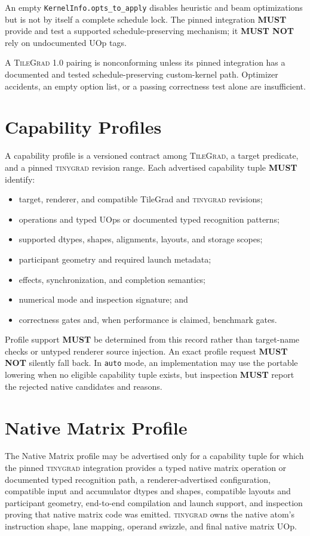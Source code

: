 \documentclass[10pt,letterpaper]{article}
\newcommand{\TileGrad}{\textsc{TileGrad}}
\newcommand{\tinygrad}{\textsc{tinygrad}}
\newcommand{\must}{\textbf{MUST}}
\newcommand{\mustnot}{\textbf{MUST NOT}}
\begin{document}
An empty \texttt{KernelInfo.opts\_to\_apply} disables heuristic and beam
optimizations but is not by itself a complete schedule lock. The pinned
integration \must{} provide and test a supported schedule-preserving mechanism;
it \mustnot{} rely on undocumented UOp tags.

A \TileGrad{} 1.0 pairing is nonconforming unless its pinned integration has a
documented and tested schedule-preserving custom-kernel path. Optimizer
accidents, an empty option list, or a passing correctness test alone are
insufficient.

\section*{Capability Profiles}

A capability profile is a versioned contract among \TileGrad{}, a target
predicate, and a pinned \tinygrad{} revision range. Each advertised capability
tuple \must{} identify:

\begin{itemize}
  \item target, renderer, and compatible TileGrad and \tinygrad{} revisions;
  \item operations and typed UOps or documented typed recognition patterns;
  \item supported dtypes, shapes, alignments, layouts, and storage scopes;
  \item participant geometry and required launch metadata;
  \item effects, synchronization, and completion semantics;
  \item numerical mode and inspection signature; and
  \item correctness gates and, when performance is claimed, benchmark gates.
\end{itemize}

Profile support \must{} be determined from this record rather than target-name
checks or untyped renderer source injection. An exact profile request
\mustnot{} silently fall back. In \texttt{auto} mode, an implementation may use
the portable lowering when no eligible capability tuple exists, but inspection
\must{} report the rejected native candidates and reasons.

\section*{Native Matrix Profile}

The Native Matrix profile may be advertised only for a capability tuple for
which the pinned \tinygrad{} integration provides a typed native matrix
operation or documented typed recognition path, a renderer-advertised
configuration, compatible input and accumulator dtypes and shapes, compatible
layouts and participant geometry, end-to-end compilation and launch support,
and inspection proving that native matrix code was emitted. \tinygrad{} owns
the native atom's instruction shape, lane mapping, operand swizzle, and final
native matrix UOp.
\end{document}

